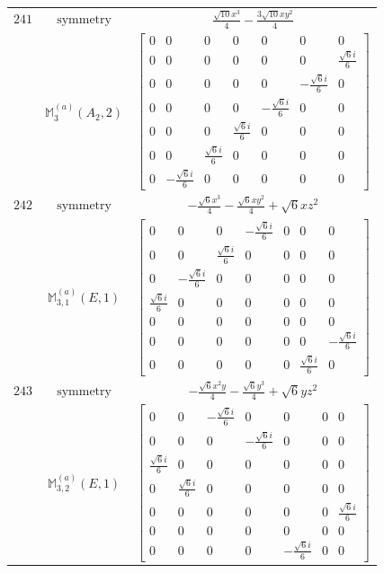 \documentclass[fleqn,8pt,landscape]{jsarticle}
\begin{document}
\begin{longtable}{ccc}
$ 241 $ & $ \text{symmetry} $ & $ \frac{\sqrt{10} x^{3}}{4} - \frac{3 \sqrt{10} x y^{2}}{4} $ \\
$  $ & $ \mathbb{M}_{3}^{(a)}(A_{2},2) $ & $ \begin{bmatrix} 0 & 0 & 0 & 0 & 0 & 0 & 0 \\ 0 & 0 & 0 & 0 & 0 & 0 & \frac{\sqrt{6} i}{6} \\ 0 & 0 & 0 & 0 & 0 & - \frac{\sqrt{6} i}{6} & 0 \\ 0 & 0 & 0 & 0 & - \frac{\sqrt{6} i}{6} & 0 & 0 \\ 0 & 0 & 0 & \frac{\sqrt{6} i}{6} & 0 & 0 & 0 \\ 0 & 0 & \frac{\sqrt{6} i}{6} & 0 & 0 & 0 & 0 \\ 0 & - \frac{\sqrt{6} i}{6} & 0 & 0 & 0 & 0 & 0 \end{bmatrix} $ \\ \hline
$ 242 $ & $ \text{symmetry} $ & $ - \frac{\sqrt{6} x^{3}}{4} - \frac{\sqrt{6} x y^{2}}{4} + \sqrt{6} x z^{2} $ \\
$  $ & $ \mathbb{M}_{3,1}^{(a)}(E,1) $ & $ \begin{bmatrix} 0 & 0 & 0 & - \frac{\sqrt{6} i}{6} & 0 & 0 & 0 \\ 0 & 0 & \frac{\sqrt{6} i}{6} & 0 & 0 & 0 & 0 \\ 0 & - \frac{\sqrt{6} i}{6} & 0 & 0 & 0 & 0 & 0 \\ \frac{\sqrt{6} i}{6} & 0 & 0 & 0 & 0 & 0 & 0 \\ 0 & 0 & 0 & 0 & 0 & 0 & 0 \\ 0 & 0 & 0 & 0 & 0 & 0 & - \frac{\sqrt{6} i}{6} \\ 0 & 0 & 0 & 0 & 0 & \frac{\sqrt{6} i}{6} & 0 \end{bmatrix} $ \\ \hline
$ 243 $ & $ \text{symmetry} $ & $ - \frac{\sqrt{6} x^{2} y}{4} - \frac{\sqrt{6} y^{3}}{4} + \sqrt{6} y z^{2} $ \\
$  $ & $ \mathbb{M}_{3,2}^{(a)}(E,1) $ & $ \begin{bmatrix} 0 & 0 & - \frac{\sqrt{6} i}{6} & 0 & 0 & 0 & 0 \\ 0 & 0 & 0 & - \frac{\sqrt{6} i}{6} & 0 & 0 & 0 \\ \frac{\sqrt{6} i}{6} & 0 & 0 & 0 & 0 & 0 & 0 \\ 0 & \frac{\sqrt{6} i}{6} & 0 & 0 & 0 & 0 & 0 \\ 0 & 0 & 0 & 0 & 0 & 0 & \frac{\sqrt{6} i}{6} \\ 0 & 0 & 0 & 0 & 0 & 0 & 0 \\ 0 & 0 & 0 & 0 & - \frac{\sqrt{6} i}{6} & 0 & 0 \end{bmatrix} $ \\ \hline

\end{longtable}
\end{document}
